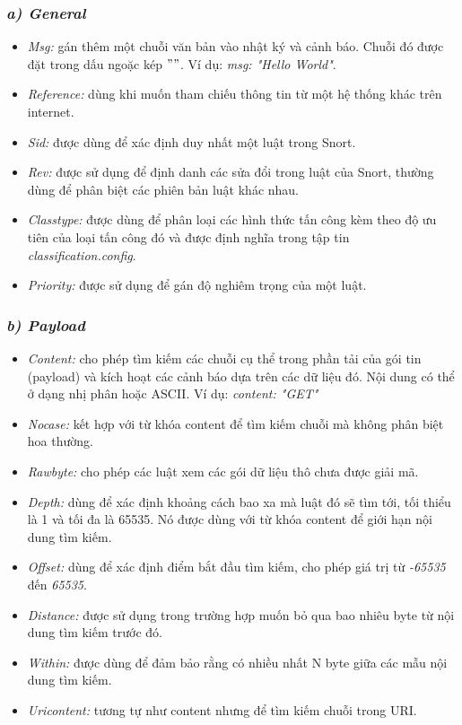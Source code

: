 \subsubsection*{\textit{a) General}}

\begin{itemize}
\item \emph{Msg:} gán thêm một chuỗi văn bản vào nhật ký và cảnh báo. Chuỗi đó được đặt trong dấu ngoặc kép \(" "\). Ví dụ: \emph{msg: "Hello World"}.
\item \emph{Reference:} dùng khi muốn tham chiếu thông tin từ một hệ thống khác trên internet.
\item \emph{Sid:} được dùng để xác định duy nhất một luật trong Snort.
\item \emph{Rev:} được sử dụng để định danh các sửa đổi trong luật của Snort, thường dùng để phân biệt các phiên bản luật khác nhau.
\item \emph{Classtype:} được dùng để phân loại các hình thức tấn công kèm theo độ ưu tiên của loại tấn công đó và được định nghĩa trong tập tin \emph{classification.config}.
\item \emph{Priority:} được sử dụng để gán độ nghiêm trọng của một luật.
\end{itemize}

\subsubsection*{\textit{b) Payload}}

\begin{itemize}
\item \emph{Content:} cho phép tìm kiếm các chuỗi cụ thể trong phần tải của gói tin (payload) và kích hoạt các cảnh báo dựa trên các dữ liệu đó. Nội dung có thể ở dạng nhị phân hoặc ASCII. Ví dụ: \emph{content: "GET"}
\item \emph{Nocase:} kết hợp với từ khóa content để tìm kiếm chuỗi mà không phân biệt hoa thường.
\item \emph{Rawbyte:} cho phép các luật xem các gói dữ liệu thô chưa được giải mã.
\item \emph{Depth:} dùng để xác định khoảng cách bao xa mà luật đó sẽ tìm tới, tối thiểu là 1 và tối đa là 65535. Nó được dùng với từ khóa content để giới hạn nội dung tìm kiếm.
\item \emph{Offset:} dùng để xác định điểm bắt đầu tìm kiếm, cho phép giá trị từ \emph{-65535} đến \emph{65535}.
\item \emph{Distance:} được sử dụng trong trường hợp muốn bỏ qua bao nhiêu byte từ nội dung tìm kiếm trước đó.
\item \emph{Within:} được dùng để đảm bảo rằng có nhiều nhất N byte giữa các mẫu nội dung tìm kiếm.
\item \emph{Uricontent:} tương tự như content nhưng để tìm kiếm chuỗi trong URI.
\end{itemize}

